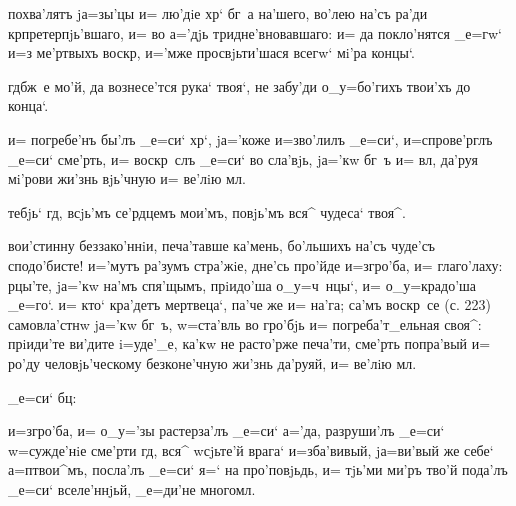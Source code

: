  похва'лятъ jа=зы'цы и= лю'дiе хр` бг~а 
на'шего, во'лею на'съ ра'ди кр претерпjь'вшаго, и= во 
а='дjь тридне'вновавшаго: и= да покло'нятся _е=гw` и=з\ъ 
ме'ртвыхъ воскр, и='мже просвjьти'шася всегw` мi'ра 
концы`.

  гд бж~е мо'й, да вознесе'тся 
рука` твоя`, не забу'ди о_у=бо'гихъ твои'хъ до конца`.

 и= погребе'нъ бы'лъ _е=си` хр`, 
jа='коже и=зво'лилъ _е=си`, и=спрове'рглъ _е=си` сме'рть, 
и= воскр~слъ _е=си` во сла'вjь, jа='кw бг~ъ и= вл, 
да'руя мi'рови жи'знь вjь'чную и= ве'лiю мл.

  тебjь` гд, всjь'мъ 
се'рдцемъ мои'мъ, повjь'мъ вся^ чудеса` твоя^.

 вои'стинну беззако'ннiи, печа'тавше ка'мень, 
бо'льшихъ на'съ чуде'съ сподо'бисте! и='мутъ ра'зумъ 
стра'жiе, дне'сь про'йде и=з\ъ гро'ба, и= глаго'лаху: 
рцы'те, jа='кw на'мъ спя'щымъ, прiидо'ша о_у=ч~нцы`, и= 
о_у=крадо'ша _е=го`. и= кто` кра'детъ мертвеца`, па'че же 
и= на'га; са'мъ воскр~се (с. 223) самовла'стнw jа='кw 
бг~ъ, w=ста'вль во гро'бjь и= погреба'т_ельная своя^: 
прiиди'те ви'дите i=уде'_е, ка'кw не расто'рже печа'ти, 
сме'рть попра'вый и= ро'ду человjь'ческому безконе'чную 
жи'знь да'руяй, и= ве'лiю мл.

       _е=си` бц: 

 и=з\ъ гро'ба, и= о_у='зы растерза'лъ 
_е=си` а='да, разруши'лъ _е=си` w=сужде'нiе сме'рти 
гд, вся^ w\т сjьте'й врага` и=зба'вивый, jа=ви'вый же 
себе` а=п твои^мъ, посла'лъ _е=си` я=` на 
про'повjьдь, и= тjь'ми ми'ръ тво'й пода'лъ _е=си` 
вселе'ннjьй, _е=ди'не многомл.
